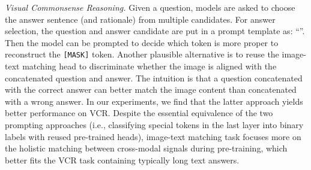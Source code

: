 \documentclass[11pt]{article}
\begin{document}
\smallskip
\textit{Visual Commonsense Reasoning.} Given a question, models are asked to choose the answer sentence (and rationale) from multiple candidates. For answer selection, the question  and answer candidate  are put in a prompt template as: ``''. Then the model can be prompted to decide which token  is more proper to reconstruct the \texttt{[MASK]} token. Another plausible alternative is to reuse the image-text matching head to discriminate whether the image is aligned with the concatenated question and answer. The intuition is that a question concatenated with the correct answer can better match the image content than concatenated with a wrong answer. In our experiments, we find that the latter approach yields better performance on VCR. Despite the essential equivalence of the two prompting approaches (i.e., classifying special tokens in the last layer into binary labels with reused pre-trained heads), image-text matching task focuses more on the holistic matching between cross-modal signals during pre-training, which better fits the VCR task containing typically long text answers.
\end{document}

